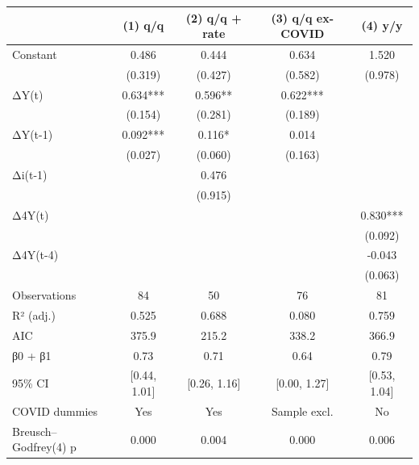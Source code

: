 \begin{tabular}{lcccc}
\toprule
 & (1) q/q & (2) q/q + rate & (3) q/q ex-COVID & (4) y/y \\
\midrule
Constant & 0.486 & 0.444 & 0.634 & 1.520 \\
   & (0.319) & (0.427) & (0.582) & (0.978) \\
ΔY(t) & 0.634*** & 0.596** & 0.622*** &  \\
     & (0.154) & (0.281) & (0.189) &  \\
ΔY(t-1) & 0.092*** & 0.116* & 0.014 &  \\
       & (0.027) & (0.060) & (0.163) &  \\
Δi(t-1) &  & 0.476 &  &  \\
         &  & (0.915) &  &  \\
Δ4Y(t) &  &  &  & 0.830*** \\
           &  &  &  & (0.092) \\
Δ4Y(t-4) &  &  &  & -0.043 \\
             &  &  &  & (0.063) \\
Observations & 84 & 50 & 76 & 81 \\
R² (adj.) & 0.525 & 0.688 & 0.080 & 0.759 \\
AIC & 375.9 & 215.2 & 338.2 & 366.9 \\
β0 + β1 & 0.73 & 0.71 & 0.64 & 0.79 \\
  95\% CI & [0.44, 1.01] & [0.26, 1.16] & [0.00, 1.27] & [0.53, 1.04] \\
COVID dummies & Yes & Yes & Sample excl. & No \\
Breusch–Godfrey(4) p & 0.000 & 0.004 & 0.000 & 0.006 \\
\bottomrule
\end{tabular}
